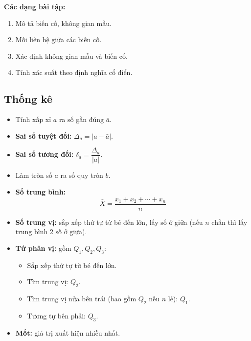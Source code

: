 \documentclass[12pt,a4paper]{article}
\begin{document}
\medskip\noindent\textbf{Các dạng bài tập:}
\begin{enumerate}[label=\textbf{Dạng \arabic*:}, leftmargin=*, align=left]
  \item Mô tả biến cố, không gian mẫu.
  \item Mối liên hệ giữa các biến cố.
  \item Xác định không gian mẫu và biến cố.
  \item Tính xác suất theo định nghĩa cổ điển.
\end{enumerate}

\subsection{Thống kê}

\begin{dinhnghia}
  \begin{itemize}
    \item Tính xấp xỉ $a$ ra số gần đúng $\bar{a}$.
    \item \textbf{Sai số tuyệt đối:} $\Delta_a = |a - \bar{a}|$.
    \item \textbf{Sai số tương đối:} $\delta_a = \dfrac{\Delta_a}{|a|}$.
    \item Làm tròn số $a$ ra số quy tròn $b$.
  \end{itemize}
\end{dinhnghia}

\begin{congthuc}[title={Các số đặc trưng đo xu thế trung tâm (ôn lại lớp 7)}]
  \begin{itemize}
    \item \textbf{Số trung bình:}
      \[
        \bar{X} = \dfrac{x_1 + x_2 + \cdots + x_n}{n}
      \]
    \item \textbf{Số trung vị:} sắp xếp thứ tự từ bé đến lớn, lấy số ở giữa (nếu $n$ chẵn thì lấy trung bình 2 số ở giữa).
    \item \textbf{Tứ phân vị:} gồm $Q_1, Q_2, Q_3$:
      \begin{itemize}
        \item Sắp xếp thứ tự từ bé đến lớn.
        \item Tìm trung vị: $Q_2$.
        \item Tìm trung vị nửa bên trái (bao gồm $Q_2$ nếu $n$ lẻ): $Q_1$.
        \item Tương tự bên phải: $Q_3$.
      \end{itemize}
    \item \textbf{Mốt:} giá trị xuất hiện nhiều nhất.
  \end{itemize}
\end{congthuc}
\end{document}
